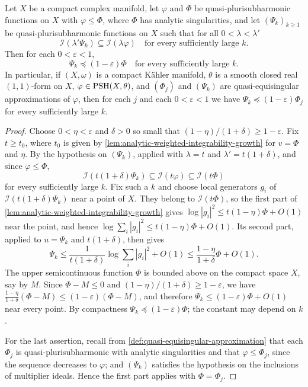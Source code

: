 \begin{proposition}\label{prop:quasi-equisingular-comparison}
Let $X$ be a compact complex manifold, let $\varphi$ and $\Phi$ be quasi-plurisubharmonic functions on $X$ with $\varphi\leq\Phi$, where $\Phi$ has analytic singularities, and let $(\Psi_k)_{k\geq1}$ be quasi-plurisubharmonic functions on $X$ such that for all $0<\lambda<\lambda'$
\[
 \mathcal I(\lambda'\Psi_k)\subseteq\mathcal I(\lambda\varphi)
 \quad\text{for every sufficiently large }k.
\]
Then for each $0<\varepsilon<1$,
\[
 \Psi_k\preceq(1-\varepsilon)\Phi
 \quad\text{for every sufficiently large }k.
\]
In particular, if $(X,\omega)$ is a compact K\"ahler manifold, $\theta$ is a smooth closed real $(1,1)$-form on $X$, $\varphi\in\mathrm{PSH}(X,\theta)$, and $(\Phi_j)$ and $(\Psi_k)$ are quasi-equisingular approximations of $\varphi$, then for each $j$ and each $0<\varepsilon<1$ we have $\Psi_k\preceq(1-\varepsilon)\Phi_j$ for every sufficiently large $k$.
\end{proposition}
\begin{proof}
Choose $0<\eta<\varepsilon$ and $\delta>0$ so small that $(1-\eta)/(1+\delta)\geq1-\varepsilon$. Fix $t\geq t_0$, where $t_0$ is given by \cref{lem:analytic-weighted-integrability-growth} for $v=\Phi$ and $\eta$. By the hypothesis on $(\Psi_k)$, applied with $\lambda=t$ and $\lambda'=t(1+\delta)$, and since $\varphi\leq\Phi$,
\[
 \mathcal I(t(1+\delta)\Psi_k)
       \subseteq\mathcal I(t\varphi)\subseteq\mathcal I(t\Phi)
\]
for every sufficiently large $k$. Fix such a $k$ and choose local generators $g_i$ of $\mathcal I(t(1+\delta)\Psi_k)$ near a point of $X$. They belong to $\mathcal I(t\Phi)$, so the first part of \cref{lem:analytic-weighted-integrability-growth} gives $\log|g_i|^2\leq t(1-\eta)\Phi+O(1)$ near the point, and hence $\log\sum_i|g_i|^2\leq t(1-\eta)\Phi+O(1)$. Its second part, applied to $u=\Psi_k$ and $t(1+\delta)$, then gives
\[
 \Psi_k\leq\frac1{t(1+\delta)}\log\sum_i|g_i|^2+O(1)
       \leq\frac{1-\eta}{1+\delta}\Phi+O(1).
\]
The upper semicontinuous function $\Phi$ is bounded above on the compact space $X$, say by $M$. Since $\Phi-M\leq0$ and $(1-\eta)/(1+\delta)\geq1-\varepsilon$, we have $\frac{1-\eta}{1+\delta}(\Phi-M)\leq(1-\varepsilon)(\Phi-M)$, and therefore $\Psi_k\leq(1-\varepsilon)\Phi+O(1)$ near every point. By compactness $\Psi_k\preceq(1-\varepsilon)\Phi$; the constant may depend on $k$.

For the last assertion, recall from \cref{def:quasi-equisingular-approximation} that each $\Phi_j$ is quasi-plurisubharmonic with analytic singularities and that $\varphi\leq\Phi_j$, since the sequence decreases to $\varphi$; and $(\Psi_k)$ satisfies the hypothesis on the inclusions of multiplier ideals. Hence the first part applies with $\Phi=\Phi_j$.
\end{proof}

